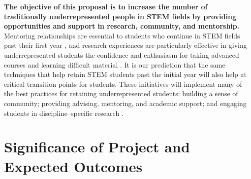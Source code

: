 \documentclass[12pt]{article}
\begin{document}

	
{\bf The objective of this proposal is to increase the number of traditionally underrepresented people in STEM fields by providing opportunities and support in research, community, and mentorship.} Mentoring relationships are essential to students who continue in STEM fields past their first year \citep{reureport,Nagda,Wilson}, and research experiences are particularly effective in giving underrepresented students the confidence and enthusiasm for taking advanced courses and learning difficult material \citep{armstrong03}. It is our prediction that the same techniques that help retain STEM students past the initial year will also help at critical transition points for students. These initiatives will implement many of the best practices for retaining underrepresented students:  building a sense of community; providing advising, mentoring, and academic support; and engaging students in discipline--specific research \citep{jordan,holland}. 	

\section{Significance of Project and Expected Outcomes}

\end{document}
